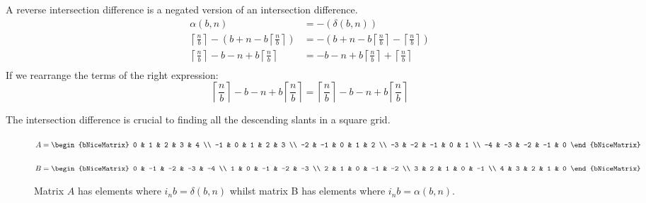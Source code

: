 \documentclass[letterpaper, twoside,12pt]{book}
\begin{document}
    A reverse intersection difference is a negated version of an intersection difference.
    \begin{equation}
        \begin{split}
            \alpha(b,n) &= -(\delta(b,n))\\
            \left\lceil \frac{n}{b} \right\rceil - (b + n - b\left\lceil \frac{n}{b} \right\rceil) &= - ( b + n - b\left\lceil \frac{n}{b} \right\rceil - \left\lceil \frac{n}{b} \right\rceil)\\
            \left\lceil \frac{n}{b} \right\rceil - b - n + b\left\lceil \frac{n}{b} \right\rceil &= - b - n + b\left\lceil \frac{n}{b} \right\rceil + \left\lceil \frac{n}{b} \right\rceil\\
        \end{split}
    \end{equation}
    If we rearrange the terms of the right expression:
    \begin{equation*}
        \left\lceil \frac{n}{b} \right\rceil - b - n + b\left\lceil \frac{n}{b} \right\rceil = \left\lceil \frac{n}{b} \right\rceil - b - n + b\left\lceil \frac{n}{b} \right\rceil
    \end{equation*}

    The intersection difference is crucial to finding all the descending slants in a square grid.

    \begin{figure}[ht]
        \centering
        \begin{minipage}{0.45\textwidth}
            \centering
            {$
            A =
            \begin{bNiceMatrix}
                0 & 1 & 2 & 3 & 4 \\
                -1 & 0 & 1 & 2 & 3 \\
                -2 & -1 & 0 & 1 & 2 \\
                -3 & -2 & -1 & 0 & 1 \\
                -4 & -3 & -2 & -1 & 0
            \end{bNiceMatrix}
            $}
        \end{minipage}
        \hfill
        \begin{minipage}{0.45\textwidth}
            \centering
            {$
            B =
            \begin{bNiceMatrix}
                0 & -1 & -2 & -3 & -4 \\
                1 & 0 & -1 & -2 & -3 \\
                2 & 1 & 0 & -1 & -2 \\
                3 & 2 & 1 & 0 & -1 \\
                4 & 3 & 2 & 1 & 0
            \end{bNiceMatrix}
            $}
        \end{minipage}
        \caption{Matrix $A$ has elements where $i_{n}b = \delta(b,n)$ whilst matrix B has elements where $i_{n}b = \alpha(b,n)$.}
    \end{figure}
\end{document}
